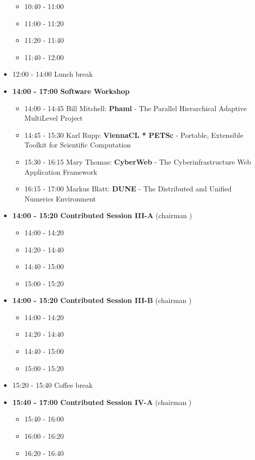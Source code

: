 \documentclass[10pt, A4]{article}%
\begin{document}
\begin{itemize}
  \begin{itemize}
    \item 10:40 - 11:00
    \item 11:00 - 11:20 
    \item 11:20 - 11:40 
    \item 11:40 - 12:00 
  \end{itemize}
  \item 12:00 - 14:00 Lunch break
  \item {\bf 14:00 - 17:00 Software Workshop}
  \begin{itemize}
    \item 14:00 - 14:45 Bill Mitchell: {\bf Phaml} - The Parallel Hierarchical Adaptive MultiLevel Project
    \item 14:45 - 15:30 Karl Rupp: {\bf ViennaCL * PETSc} - Portable, Extensible Toolkit for
Scientific Computation
    \item 15:30 - 16:15 Mary Thomas: {\bf CyberWeb} - The Cyberinfrastructure Web Application Framework
    \item 16:15 - 17:00 Markus Blatt: {\bf DUNE} - The Distributed and Unified Numerics Environment
  \end{itemize}
  \item {\bf 14:00 - 15:20 Contributed Session III-A} (chairman ) 
  \begin{itemize}
    \item 14:00 - 14:20 
    \item 14:20 - 14:40 
    \item 14:40 - 15:00
    \item 15:00 - 15:20  
  \end{itemize}
  \item {\bf 14:00 - 15:20 Contributed Session III-B} (chairman ) 
  \begin{itemize}
    \item 14:00 - 14:20 
    \item 14:20 - 14:40 
    \item 14:40 - 15:00
    \item 15:00 - 15:20  
  \end{itemize}
  \item 15:20 - 15:40 Coffee break
  \item {\bf 15:40 - 17:00 Contributed Session IV-A} (chairman ) 
  \begin{itemize}
    \item 15:40 - 16:00
    \item 16:00 - 16:20 
    \item 16:20 - 16:40 

\end{itemize}
\end{itemize}
\end{document}
